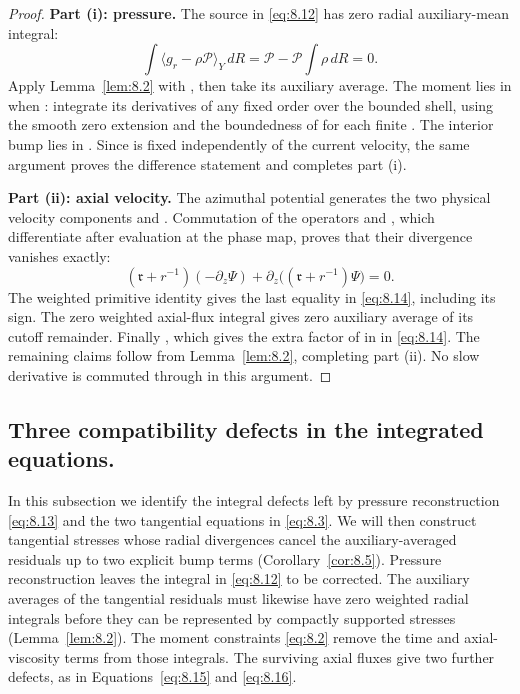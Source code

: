 \begin{proof}
\noindent\textbf{Part (i): pressure.} The source in \eqref{eq:8.12} has zero radial auxiliary-mean
integral:
\[
\int\langle g_r-\rho\mathcal P\rangle_Y\,dR
=\mathcal P-\mathcal P\int\rho\,dR=0.
\]
Apply Lemma~\ref{lem:8.2} with , then take its auxiliary average. The
moment  lies in  when
: integrate its derivatives of any fixed order over
the bounded shell, using the smooth zero extension and the boundedness of
 for each finite . The interior bump
 lies in . Since
 is fixed independently of the current velocity, the same argument proves
the difference statement and completes part (i).

\noindent\textbf{Part (ii): axial velocity.} The azimuthal potential generates the two physical
velocity components  and
. Commutation of the operators
 and , which differentiate after
evaluation at the phase map, proves that their divergence vanishes exactly:
\[
(\mathfrak r+r^{-1})(-\partial_z\Psi)+\partial_z\bigl((\mathfrak r+r^{-1})\Psi\bigr)=0.
\]
The weighted primitive identity gives the last equality in \eqref{eq:8.14}, including its sign. The
zero weighted axial-flux integral gives zero auxiliary average of its cutoff remainder. Finally
, which gives the extra factor of
 in  in \eqref{eq:8.14}. The
remaining claims follow from Lemma~\ref{lem:8.2}, completing part (ii). No slow derivative is
commuted through  in this argument.
\end{proof}

\subsection{Three compatibility defects in the integrated equations.}\label{sec:8.4}
In this subsection we identify the integral defects left by pressure reconstruction \eqref{eq:8.13}
and the two tangential equations in \eqref{eq:8.3}. We will then construct tangential stresses whose
radial divergences cancel the auxiliary-averaged residuals up to two explicit bump terms
(Corollary~\ref{cor:8.5}). Pressure reconstruction leaves the integral
 in \eqref{eq:8.12} to be corrected. The auxiliary averages of the
tangential residuals must likewise have zero weighted radial integrals before they can be represented
by compactly supported stresses (Lemma~\ref{lem:8.2}). The moment constraints \eqref{eq:8.2}
remove the time and axial-viscosity terms from those integrals. The surviving axial fluxes give two
further defects, as in Equations~\eqref{eq:8.15} and \eqref{eq:8.16}.

